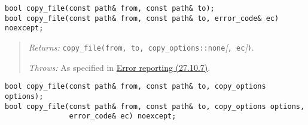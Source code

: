 \begin{verbatim}
bool copy_file(const path& from, const path& to);
bool copy_file(const path& from, const path& to, error_code& ec) noexcept;
\end{verbatim}

\begin{quote}
\emph{Returns:}
\texttt{copy\_file(from,\ to,\ copy\_options::none}\emph{{[}}\texttt{,\ ec}\emph{{]}}\texttt{)}.

\emph{Throws:} As specified in \hyperref[Error-reporting]{Error
reporting (27.10.7)}.
\end{quote}

\begin{verbatim}
bool copy_file(const path& from, const path& to, copy_options options);
bool copy_file(const path& from, const path& to, copy_options options,
               error_code& ec) noexcept;
\end{verbatim}

